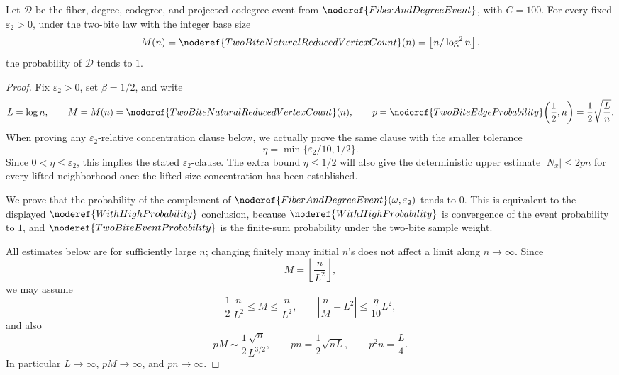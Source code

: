 \begin{lemma}
Let \(\mathcal D\) be the fiber, degree, codegree, and projected-codegree event
from \(\noderef{FiberAndDegreeEvent}\), with \(C=100\). For every fixed
\(\varepsilon_2>0\), under the two-bite law with the integer base size
\[
M(n)=\noderef{TwoBiteNaturalReducedVertexCount}(n)
=\left\lfloor n/\log^2 n\right\rfloor ,
\]
the probability of \(\mathcal D\) tends to \(1\).
\end{lemma}
\begin{proof}
Fix \(\varepsilon_2>0\), set \(\beta=1/2\), and write
\[
L=\log n,\qquad
M=M(n)=\noderef{TwoBiteNaturalReducedVertexCount}(n),\qquad
p=\noderef{TwoBiteEdgeProbability}\!\left(\frac12,n\right)
  =\frac12\sqrt{\frac Ln}.
\]
When proving any \(\varepsilon_2\)-relative concentration clause below, we
actually prove the same clause with the smaller tolerance
\[
\eta=\min\{\varepsilon_2/10,1/2\}.
\]
Since \(0<\eta\le\varepsilon_2\), this implies the stated
\(\varepsilon_2\)-clause.  The extra bound \(\eta\le1/2\) will also give the
deterministic upper estimate \(|N_x|\le2pn\) for every lifted neighborhood
once the lifted-size concentration has been established.

We prove that the probability of the complement of
\(\noderef{FiberAndDegreeEvent}(\omega,\varepsilon_2)\) tends to \(0\).  This
is equivalent to the displayed \(\noderef{WithHighProbability}\) conclusion,
because \(\noderef{WithHighProbability}\) is convergence of the event
probability to \(1\), and \(\noderef{TwoBiteEventProbability}\) is the
finite-sum probability under the two-bite sample weight.

All estimates below are for sufficiently large \(n\); changing finitely many
initial \(n\)'s does not affect a limit along \(n\to\infty\).  Since
\[
M=\left\lfloor \frac n{L^2}\right\rfloor ,
\]
we may assume
\[
\frac12\,\frac n{L^2}\le M\le \frac n{L^2},\qquad
\left|\frac nM-L^2\right|\le \frac{\eta}{10}L^2,
\tag{1}
\]
and also
\[
pM\sim \frac12\frac{\sqrt n}{L^{3/2}},\qquad
pn=\frac12\sqrt{nL},\qquad
p^2n=\frac L4.
\tag{2}
\]
In particular \(L\to\infty\), \(pM\to\infty\), and \(pn\to\infty\).


\end{proof}
